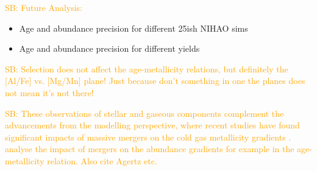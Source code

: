 \documentclass[fleqn,usenatbib]{mnras}
\newcommand{\SB}[1]{{\textcolor{orange}{SB: #1}}}
\begin{document}
\SB{Future Analysis:}
\begin{itemize}
\item Age and abundance precision for different 25ish NIHAO sims
\item Age and abundance precision for different yields
\end{itemize}

\SB{Selection does not affect the age-metallicity relations, but definitely the [Al/Fe] vs. [Mg/Mn] plane! Just because don't something in one the planes does not mean it's not there!}


\SB{These observations of stellar and gaseous components complement the advancements from the modelling perspective, where recent studies have found significant impacts of massive mergers on the cold gas metallicity gradients \citep{Buck2023}. \citet{Buck2023} analyse the impact of mergers on the abundance gradients for example in the age-metallicity relation. Also cite Agertz etc.}

\end{document}
